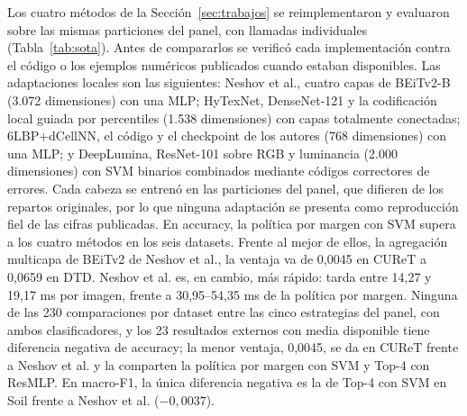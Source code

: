\documentclass[a4paper,fleqn]{cas-sc}
\begin{document}
Los cuatro métodos de la Sección~\ref{sec:trabajos} se reimplementaron y evaluaron sobre las mismas particiones del panel, con llamadas individuales (Tabla~\ref{tab:sota}). Antes de compararlos se verificó cada implementación contra el código o los ejemplos numéricos publicados cuando estaban disponibles. Las adaptaciones locales son las siguientes: Neshov et al., cuatro capas de BEiTv2-B (3.072 dimensiones) con una MLP; HyTexNet, DenseNet-121 y la codificación local guiada por percentiles (1.538 dimensiones) con capas totalmente conectadas; 6LBP+dCellNN, el código y el checkpoint de los autores (768 dimensiones) con una MLP; y DeepLumina, ResNet-101 sobre RGB y luminancia (2.000 dimensiones) con SVM binarios combinados mediante códigos correctores de errores. Cada cabeza se entrenó en las particiones del panel, que difieren de los repartos originales, por lo que ninguna adaptación se presenta como reproducción fiel de las cifras publicadas. En accuracy, la política por margen con SVM supera a los cuatro métodos en los seis datasets. Frente al mejor de ellos, la agregación multicapa de BEiTv2 de Neshov et al., la ventaja va de 0,0045 en CUReT a 0,0659 en DTD. Neshov et al. es, en cambio, más rápido: tarda entre 14,27 y 19,17 ms por imagen, frente a 30,95--54,35 ms de la política por margen. Ninguna de las 230 comparaciones por dataset entre las cinco estrategias del panel, con ambos clasificadores, y los 23 resultados externos con media disponible tiene diferencia negativa de accuracy; la menor ventaja, 0,0045, se da en CUReT frente a Neshov et al. y la comparten la política por margen con SVM y Top-4 con ResMLP. En macro-F1, la única diferencia negativa es la de Top-4 con SVM en Soil frente a Neshov et al. ($-0{,}0037$).
\end{document}
